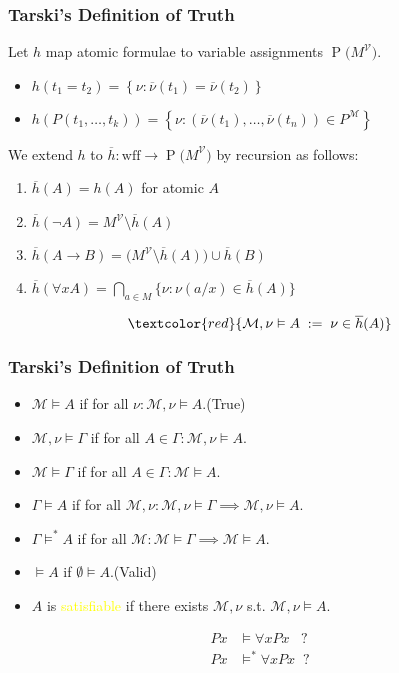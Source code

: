 \documentclass[UTF8,aspectratio=43,11pt,colorlinks,compress,openany]{beamer}%
\begin{document}
\begin{frame}\frametitle{Tarski's Definition of Truth}
	Let $h$ map atomic formulae to variable assignments $\operatorname{P}\big(M^{\mathcal{V}}\big)$.
	\begin{itemize}
		\item $h(t_1=t_2)=\left\{\nu:\overline{\nu}(t_1)=\overline{\nu}(t_2)\right\}$
		\item $h(P(t_1,\dots,t_k))=\left\{\nu:(\overline{\nu}(t_1),\dots,\overline{\nu}(t_n))\in P^{\mathcal{M}}\right\}$
	\end{itemize}
	We extend $h$ to $\overline{h}:\mathrm{wff}\to \operatorname{P}\big(M^{\mathcal{V}}\big)$ by recursion as follows:\\
	\vspace{2ex}
	\begin{block}{}
		\begin{enumerate}
			\item $\overline{h}(A)=h(A)$ for atomic $A$
			\item $\overline{h}(\neg A)=M^{\mathcal{V}}\setminus\overline{h}(A)$
			\item $\overline{h}(A\to B)=\big(M^{\mathcal{V}}\setminus\overline{h}(A)\big)\cup\overline{h}(B)$
			\item $\overline{h}(\forall x A)=\bigcap\limits_{a\in M}\big\{\nu: \nu(a/x)\in\overline{h}(A)\big\}$
		\end{enumerate}
	\end{block}
	\[\textcolor{red}{\mathcal{M},\nu\vDash A \;:=\;\nu\in\overline{h}(A)}\]
\end{frame}

\begin{frame}\frametitle{Tarski's Definition of Truth}
		\begin{block}{}
			\begin{itemize}
				\item $\mathcal{M}\vDash A$ if for all $\nu:\mathcal{M},\nu\vDash A$.\hfill (True)
				\item $\mathcal{M},\nu\vDash\Gamma$ if for all $A\in\Gamma: \mathcal{M},\nu\vDash A$.
				\item $\mathcal{M}\vDash\Gamma$ if for all $A\in\Gamma:\mathcal{M}\vDash A$.
				\item $\Gamma\vDash A$ if for all $\mathcal{M},\nu: \mathcal{M},\nu\vDash\Gamma\implies\mathcal{M},\nu\vDash A$.
				\item $\Gamma\vDash^* A$ if for all $\mathcal{M}:\mathcal{M}\vDash\Gamma\implies\mathcal{M}\vDash A$.
				\item $\vDash A$ if $\emptyset\vDash A$.\hfill (Valid)
				\item $A$ is \textcolor{yellow}{satisfiable} if there exists $\mathcal{M},\nu$ s.t. $\mathcal{M},\nu\vDash A$.
			\end{itemize}
		\end{block}
\begin{align*}
Px&\vDash\forall xPx\;\;\;?\\
Px&\vDash^*\forall xPx\;\;?
\end{align*}
\end{frame}
\end{document}
